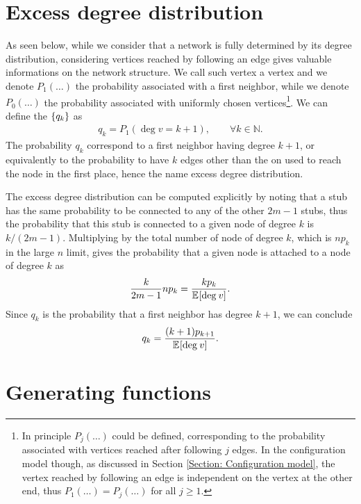 \documentclass[
11pt, %
american, %
singlespacing, %
final, %
nolistspacing, %
liststotoc, %
headsepline, %
]{MastersDoctoralThesis} %
\begin{document}
\section{Excess degree distribution}

As seen below, while we consider that a network is fully determined by its degree distribution, considering vertices reached by following an edge gives valuable informations on the network structure. We call such vertex a  vertex and we denote $P_1(\dots)$ the probability associated with a first neighbor, while we denote $P_0(\dots)$ the probability associated with uniformly chosen vertices\footnote{In principle $P_j(\dots)$ could be defined, corresponding to the probability associated with vertices reached after following $j$ edges. In the configuration model though, as discussed in Section \ref{Section: Configuration model}, the vertex reached by following an edge is independent on the vertex at the other end, thus $P_1(\dots) = P_j(\dots)$ for all $j \geq 1$.}. We can define the  $\{q_k\}$ as
\begin{align}
	q_k = P_1(\deg{v} = k + 1), \qquad \forall k \in \mathbb{N}.
\end{align}
The probability $q_k$ correspond to a first neighbor having degree $k + 1$, or equivalently to the probability to have $k$ edges other than the on used to reach the node in the first place, hence the name excess degree distribution.

The excess degree distribution can be computed explicitly by noting that a stub has the same probability to be connected to any of the other $2 m - 1$ stubs, thus the probability that this stub is connected to a given node of degree $k$ is $k/(2 m - 1)$. Multiplying by the total number of node of degree $k$, which is $n p_k$ in the large $n$ limit, gives the probability that a given node is attached to a node of degree $k$ as
\begin{align}
	\frac{k}{2 m -1} n p_k = \frac{k p_k}{\mathbb{E}_{}\!\left[ \mathrm{deg}_{}\, v \right]}.
\end{align}
Since $q_k$ is the probability that a first neighbor has degree $k + 1$, we can conclude
\begin{align}
	q_k = \frac{(k + 1) p_{k+1}}{\mathbb{E}_{}\!\left[ \mathrm{deg}_{}\, v \right]}. \label{qk as function of pk}
\end{align}

\section{Generating functions}
\label{Section: Generating functions}
\end{document}
